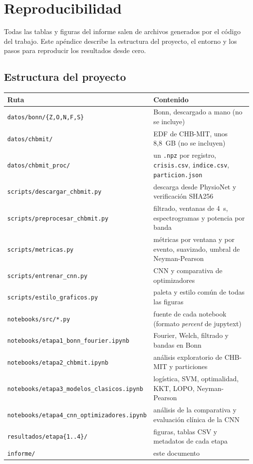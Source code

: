 \chapter{Reproducibilidad}
\label{ap:reproducibilidad}

Todas las tablas y figuras del informe salen de archivos generados por el código del trabajo. Este apéndice describe
la estructura del proyecto, el entorno y los pasos para reproducir los resultados desde cero.

\section{Estructura del proyecto}

\begin{center}
\small
\begin{tabular}{ll}
\toprule
Ruta & Contenido \\
\midrule
\texttt{datos/bonn/\{Z,O,N,F,S\}}     & Bonn, descargado a mano (no se incluye) \\
\texttt{datos/chbmit/}                & EDF de CHB-MIT, unos 8,8~GB (no se incluyen) \\
\texttt{datos/chbmit\_proc/}          & un \texttt{.npz} por registro, \texttt{crisis.csv}, \texttt{indice.csv}, \texttt{particion.json} \\
\texttt{scripts/descargar\_chbmit.py}  & descarga desde PhysioNet y verificación SHA256 \\
\texttt{scripts/preprocesar\_chbmit.py}& filtrado, ventanas de 4~s, espectrogramas y potencia por banda \\
\texttt{scripts/metricas.py}          & métricas por ventana y por evento, suavizado, umbral de Neyman-Pearson \\
\texttt{scripts/entrenar\_cnn.py}      & CNN y comparativa de optimizadores \\
\texttt{scripts/estilo\_graficos.py}   & paleta y estilo común de todas las figuras \\
\texttt{notebooks/src/*.py}           & fuente de cada notebook (formato \emph{percent} de jupytext) \\
\texttt{notebooks/etapa1\_bonn\_fourier.ipynb}        & Fourier, Welch, filtrado y bandas en Bonn \\
\texttt{notebooks/etapa2\_chbmit.ipynb}               & análisis exploratorio de CHB-MIT y particiones \\
\texttt{notebooks/etapa3\_modelos\_clasicos.ipynb}     & logística, SVM, optimalidad, KKT, LOPO, Neyman-Pearson \\
\texttt{notebooks/etapa4\_cnn\_optimizadores.ipynb}    & análisis de la comparativa y evaluación clínica de la CNN \\
\texttt{resultados/etapa\{1..4\}/}     & figuras, tablas CSV y metadatos de cada etapa \\
\texttt{informe/}                     & este documento \\
\bottomrule
\end{tabular}
\end{center}

